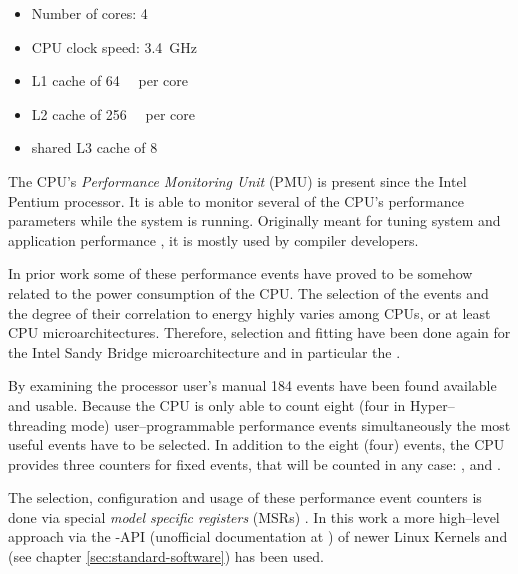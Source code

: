 \begin{itemize}

\item Number of cores: 4

\item CPU clock speed: \SI{3.4}{\giga\hertz}

\item L1 cache of \SI{64}{\kibi\byte} per core\cite{intel2011softdev1}

\item L2 cache of \SI{256}{\kibi\byte} per core\cite{intel2011softdev1}

\item shared L3 cache of \SI{8}{\mebi\byte}\cite{intel2011softdev1}

\end{itemize}


\label{sec:pmu}

The CPU's \emph{Performance Monitoring Unit} (PMU) is present since the
Intel\TReg{} Pentium processor. It is able to monitor several of the
CPU's performance parameters while the system is running. Originally meant for
tuning system and application performance \cite{intel2011softdev3b}, it is
mostly used by compiler developers.

In prior work \cite{bellosa2000benefits,snowdon2010operating,
weissel2002process,kellner03tempcontrol,bertran2010decomposable} some of these
performance events have proved to be somehow related to the power consumption of
the CPU. The selection of the events and the degree of their correlation to
energy highly varies among CPUs, or at least CPU microarchitectures. Therefore,
selection and fitting have been done again for the Intel\TReg{} San\-dy Bridge
microarchitecture and in particular the \JWPcpu{}.

By examining the processor user's manual \cite{intel2011events}
184 events have been found available and usable. Because the CPU is only able to
count eight (four in Hyper--threading \cite{HT} mode) user--programmable
performance events simultaneously \cite{intel2011softdev1} the most useful
events have to be selected. In addition to the eight (four) events, the CPU
provides three counters for fixed events, that will be counted in any case:
,  and
.

The selection, configuration and usage of these performance event counters is
done via special \emph{model specific registers} (MSRs)
\cite{intel2011softdev3b}. In this work a more high--level approach via the
-API (unofficial documentation at
\cite{weaver2011perfevents}) of newer Linux Kernels and \JWTlibpfm{} (see
chapter \ref{sec:standard-software}) has been used.


